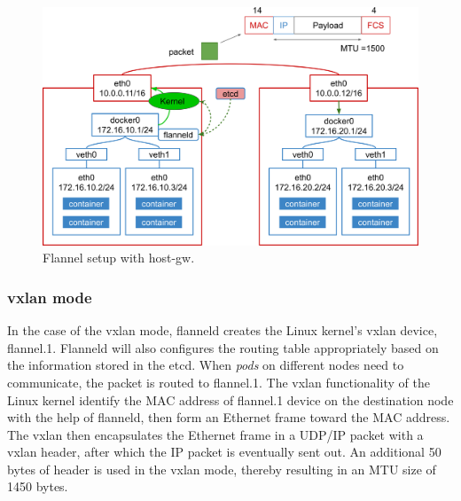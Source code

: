 \begin{figure}[h]
  \centering
  \includegraphics[width=0.8\columnwidth]{Figs/flannel-host-gw}

  \par\bigskip
  \centering
  \begin{minipage}{0.9\columnwidth}
    \caption[Flannel setup with host-gw]{
      Flannel setup with host-gw.
    }
    \label{Figs/flannel-host-gw}
  \end{minipage}
\end{figure}

\subsubsection{vxlan mode}

In the case of the vxlan mode, flanneld creates the Linux kernel's vxlan device, flannel.1. 
Flanneld will also configures the routing table appropriately based on the information stored in the etcd.
When {\em pods} on different nodes need to communicate, the packet is routed to flannel.1.
The vxlan functionality of the Linux kernel identify the MAC address of flannel.1 device on the destination node with the help of flanneld, then form an Ethernet frame toward the MAC address.
The vxlan then encapsulates the Ethernet frame in a UDP/IP packet with a vxlan header, after which the IP packet is eventually sent out.
An additional 50 bytes of header is used in the vxlan mode, thereby resulting in an MTU size of 1450 bytes.

